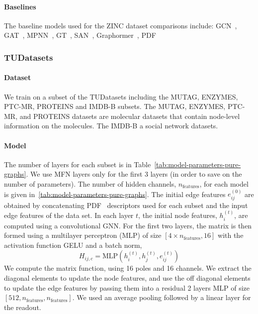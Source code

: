 \documentclass{article} \usepackage{iclr2024_conference,times}
\begin{document}
\paragraph{Baselines} 
\label{sec:baseline-zinc}
The baseline models used for the ZINC dataset comparisons include: 
GCN~\citep{kipf2017semi},
GAT~\citep{velickovic2018graph},
MPNN~\citep{gilmer2017neural},
GT~\citep{dwivedi2020benchmarking},
SAN~\citep{kreuzer2021rethinking},
Graphormer~\citep{ying2021transformers},
PDF~\citep{yang2023better}




\subsubsection{TUDatasets}

\paragraph{Dataset} We train on a subset of the TUDatasets including the MUTAG, ENZYMES, PTC-MR, PROTEINS and IMDB-B subsets. The MUTAG, ENZYMES, PTC-MR, and PROTEINS datasets are molecular datasets that contain node-level information on the molecules. The IMDB-B a social network datasets.

\paragraph{Model}
The number of layers for each subset is in Table~\ref{tab:model-parameters-pure-graphs}.
We use MFN layers only for the first 3 layers (in order to save on the number of parameters). The number of hidden channels, $n_{\text{features}}$, for each model is given in~\ref{tab:model-parameters-pure-graphs}.
The initial edge features $e_{ij}^{(0)}$ are obtained by concatenating PDF~\cite{yang2023better} descriptors used for each subset and the input edge features of the data set.  In each layer $t$, the initial node features, $h_i^{(t)}$, are computed using a convolutional GNN. 
For the first two layers, the matrix is then formed using a multilayer perceptron (MLP) of size $[4 \times n_{\text{features}},16]$ with the activation function GELU and a batch norm,
\begin{equation}
    H_{ij,c} = \text{MLP}(h_{i}^{(t)}, h_{j}^{(t)}, e_{ij}^{(t)})
\end{equation}
We compute the matrix function, using 16 poles and 16 channels. We extract the diagonal elements to update the node features, and use the off diagonal elements to update the edge features by passing them into a residual 2 layers MLP of size $[512, n_{\text{features}}, n_{\text{features}}]$. We used an average pooling followed by a linear layer for the readout.
\vspace{-8pt}
\end{document}
